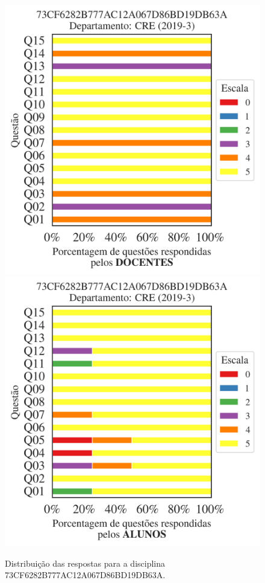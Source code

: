 \documentclass[a4paper,10pt]{article}
\begin{document}
\begin{figure}[h]
\centering
\includegraphics[width=0.485\linewidth]{analise_disciplina_departamento_CRE_73CF6282B777AC12A067D86BD19DB63A_docentes.png}
\includegraphics[width=0.485\linewidth]{analise_disciplina_departamento_CRE_73CF6282B777AC12A067D86BD19DB63A_alunos.png}
\caption{\label{fig:analise_geral_departamento}                Distribuição das respostas para a disciplina 73CF6282B777AC12A067D86BD19DB63A. }
\end{figure}
\end{document}
